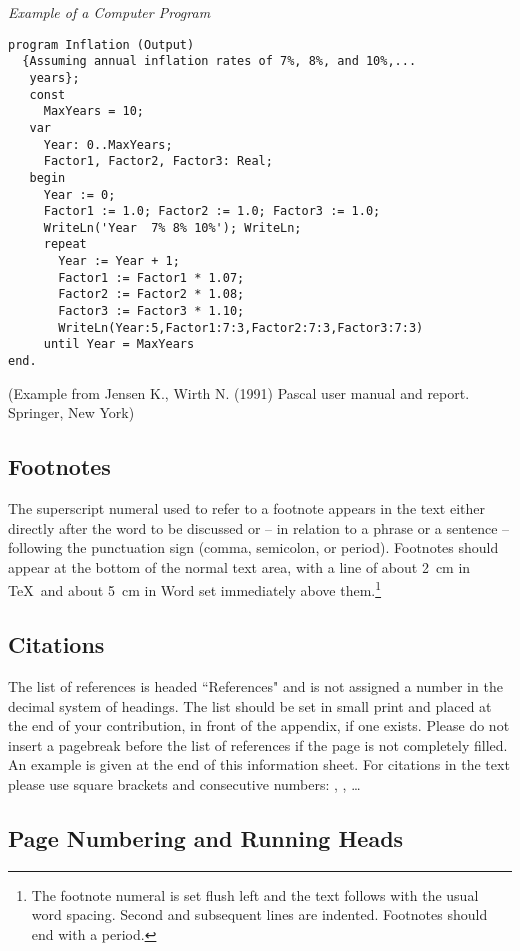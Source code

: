 \documentclass[runningheads]{llncs}
\begin{document}
\medskip

\noindent
{\it Example of a Computer Program}
\begin{verbatim}
program Inflation (Output)
  {Assuming annual inflation rates of 7%, 8%, and 10%,...
   years};
   const
     MaxYears = 10;
   var
     Year: 0..MaxYears;
     Factor1, Factor2, Factor3: Real;
   begin
     Year := 0;
     Factor1 := 1.0; Factor2 := 1.0; Factor3 := 1.0;
     WriteLn('Year  7% 8% 10%'); WriteLn;
     repeat
       Year := Year + 1;
       Factor1 := Factor1 * 1.07;
       Factor2 := Factor2 * 1.08;
       Factor3 := Factor3 * 1.10;
       WriteLn(Year:5,Factor1:7:3,Factor2:7:3,Factor3:7:3)
     until Year = MaxYears
end.
\end{verbatim}
%
\noindent
{\small (Example from Jensen K., Wirth N. (1991) Pascal user manual and
report. Springer, New York)}


\subsection{Footnotes}

The superscript numeral used to refer to a footnote appears in the text
either directly after the word to be discussed or -- in relation to a
phrase or a sentence -- following the punctuation sign (comma,
semicolon, or period). Footnotes should appear at the bottom of
the
normal text area, with a line of about 2~cm in \TeX\ and about 5~cm in
Word set
immediately above them.\footnote{The footnote numeral is set flush left
and the text follows with the usual word spacing. Second and subsequent
lines are indented. Footnotes should end with a period.}

\subsection{Citations}

The list of references is headed ``References" and is not assigned a
number
in the decimal system of headings. The list should be set in small print
and placed at the end of your contribution, in front of the appendix,
if one exists.
Please do not insert a pagebreak before the list of references if the
page is not completely filled.
An example is given at the
end of this information sheet. For citations in the text please use
square brackets and consecutive numbers: \cite{leeuw},
\cite{bru:car:pier}, \cite{mich} \dots

\subsection{Page Numbering and Running Heads}
\end{document}
